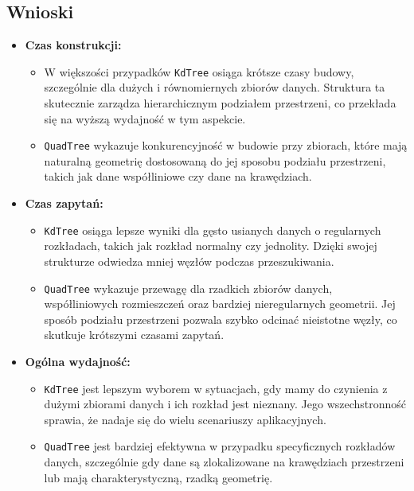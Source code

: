 \documentclass[12pt]{article}
\begin{document}
\subsection{Wnioski}
\begin{itemize}
    \item \textbf{Czas konstrukcji:} 
    \begin{itemize}
        \item W większości przypadków \texttt{KdTree} osiąga krótsze czasy budowy, szczególnie dla dużych i równomiernych zbiorów danych. Struktura ta skutecznie zarządza hierarchicznym podziałem przestrzeni, co przekłada się na wyższą wydajność w tym aspekcie.
        \item \texttt{QuadTree} wykazuje konkurencyjność w budowie przy zbiorach, które mają naturalną geometrię dostosowaną do jej sposobu podziału przestrzeni, takich jak dane współliniowe czy dane na krawędziach.
    \end{itemize}
    
    \item \textbf{Czas zapytań:}
    \begin{itemize}
        \item \texttt{KdTree} osiąga lepsze wyniki dla gęsto usianych danych o regularnych rozkładach, takich jak rozkład normalny czy jednolity. Dzięki swojej strukturze odwiedza mniej węzłów podczas przeszukiwania.
        \item \texttt{QuadTree} wykazuje przewagę dla rzadkich zbiorów danych, współliniowych rozmieszczeń oraz bardziej nieregularnych geometrii. Jej sposób podziału przestrzeni pozwala szybko odcinać nieistotne węzły, co skutkuje krótszymi czasami zapytań.
    \end{itemize}
    
    \item \textbf{Ogólna wydajność:}
    \begin{itemize}
        \item \texttt{KdTree} jest lepszym wyborem w sytuacjach, gdy mamy do czynienia z dużymi zbiorami danych i ich rozkład jest nieznany. Jego wszechstronność sprawia, że nadaje się do wielu scenariuszy aplikacyjnych.
        \item \texttt{QuadTree} jest bardziej efektywna w przypadku specyficznych rozkładów danych, szczególnie gdy dane są zlokalizowane na krawędziach przestrzeni lub mają charakterystyczną, rzadką geometrię.
    \end{itemize}
\end{itemize}
\end{document}
